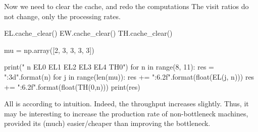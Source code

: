 \begin{exercise}
\begin{solution}
\begin{pyconsole}
\end{pyconsole}

Now we need to clear the cache, and redo the computations
The visit ratios do not change, only the processing rates.

\begin{pyconsole}
EL.cache_clear()
EW.cache_clear()
TH.cache_clear()

mu = np.array([2, 3, 3, 3, 3])

print(" n EL0 EL1 EL2 EL3 EL4 TH0")
for n in range(8, 11):
 res = "{:3d}".format(n)
 for j in range(len(mu)):
 res += "{:6.2f}".format(float(EL(j, n)))
 res += "{:6.2f}".format(float(TH(0,n)))
 print(res)
 
\end{pyconsole}

All is according to intuition. Indeed, the throughput increases
slightly. Thus, it may be interesting to increase the production rate
of non-bottleneck machines, provided its (much) easier/cheaper than
improving the bottleneck.
\end{solution}
\end{exercise}

